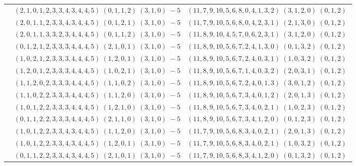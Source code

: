 \documentclass[11pt]{article}
\begin{document}
\begin{longtable}[l]{|c|c|c|}
 \cline{2-3} 
 & $(2 ,1 ,0 ,1 ,2 ,3 ,3 ,4 ,3 ,4 ,4 ,5) \;(0 ,1 ,1 ,2) \;(3 ,1 ,0) \;-5$ & $(11 ,7 ,9 ,10 ,5 ,6 ,8 ,0 ,4 ,1 ,3 ,2) \;(3 ,1 ,2 ,0) \;(0 ,1 ,2) \;$\\ 
 \cline{2-3} 
 & $(2 ,0 ,1 ,1 ,2 ,3 ,3 ,4 ,3 ,4 ,4 ,5) \;(0 ,1 ,2 ,1) \;(3 ,1 ,0) \;-5$ & $(11 ,7 ,9 ,10 ,5 ,6 ,8 ,0 ,4 ,2 ,3 ,1) \;(2 ,1 ,3 ,0) \;(0 ,1 ,2) \;$\\ 
 \cline{2-3} 
 & $(2 ,0 ,1 ,1 ,3 ,3 ,2 ,3 ,4 ,4 ,4 ,5) \;(0 ,1 ,1 ,2) \;(3 ,1 ,0) \;-5$ & $(11 ,8 ,9 ,10 ,4 ,5 ,7 ,0 ,6 ,2 ,3 ,1) \;(3 ,1 ,2 ,0) \;(0 ,1 ,2) \;$\\ 
 \cline{2-3} 
 & $(0 ,1 ,2 ,1 ,2 ,3 ,3 ,3 ,4 ,4 ,4 ,5) \;(2 ,1 ,0 ,1) \;(3 ,1 ,0) \;-5$ & $(11 ,8 ,9 ,10 ,5 ,6 ,7 ,2 ,4 ,1 ,3 ,0) \;(0 ,1 ,3 ,2) \;(0 ,1 ,2) \;$\\ 
 \cline{2-3} 
 & $(1 ,0 ,2 ,1 ,2 ,3 ,3 ,3 ,4 ,4 ,4 ,5) \;(1 ,2 ,0 ,1) \;(3 ,1 ,0) \;-5$ & $(11 ,8 ,9 ,10 ,5 ,6 ,7 ,2 ,4 ,0 ,3 ,1) \;(1 ,0 ,3 ,2) \;(0 ,1 ,2) \;$\\ 
 \cline{2-3} 
 & $(1 ,2 ,0 ,1 ,2 ,3 ,3 ,3 ,4 ,4 ,4 ,5) \;(1 ,0 ,2 ,1) \;(3 ,1 ,0) \;-5$ & $(11 ,8 ,9 ,10 ,5 ,6 ,7 ,1 ,4 ,0 ,3 ,2) \;(2 ,0 ,3 ,1) \;(0 ,1 ,2) \;$\\ 
 \cline{2-3} 
 & $(1 ,1 ,2 ,0 ,2 ,3 ,3 ,3 ,4 ,4 ,4 ,5) \;(1 ,1 ,0 ,2) \;(3 ,1 ,0) \;-5$ & $(11 ,8 ,9 ,10 ,5 ,6 ,7 ,2 ,4 ,0 ,1 ,3) \;(3 ,0 ,1 ,2) \;(0 ,1 ,2) \;$\\ 
 \cline{2-3} 
 & $(1 ,1 ,0 ,2 ,2 ,3 ,3 ,3 ,4 ,4 ,4 ,5) \;(1 ,1 ,2 ,0) \;(3 ,1 ,0) \;-5$ & $(11 ,8 ,9 ,10 ,5 ,6 ,7 ,3 ,4 ,0 ,1 ,2) \;(2 ,0 ,1 ,3) \;(0 ,1 ,2) \;$\\ 
 \cline{2-3} 
 & $(1 ,0 ,1 ,2 ,2 ,3 ,3 ,3 ,4 ,4 ,4 ,5) \;(1 ,2 ,1 ,0) \;(3 ,1 ,0) \;-5$ & $(11 ,8 ,9 ,10 ,5 ,6 ,7 ,3 ,4 ,0 ,2 ,1) \;(1 ,0 ,2 ,3) \;(0 ,1 ,2) \;$\\ 
 \cline{2-3} 
 & $(0 ,1 ,1 ,2 ,2 ,3 ,3 ,3 ,4 ,4 ,4 ,5) \;(2 ,1 ,1 ,0) \;(3 ,1 ,0) \;-5$ & $(11 ,8 ,9 ,10 ,5 ,6 ,7 ,3 ,4 ,1 ,2 ,0) \;(0 ,1 ,2 ,3) \;(0 ,1 ,2) \;$\\ 
 \cline{2-3} 
 & $(1 ,0 ,1 ,2 ,2 ,3 ,3 ,4 ,3 ,4 ,4 ,5) \;(1 ,1 ,2 ,0) \;(3 ,1 ,0) \;-5$ & $(11 ,7 ,9 ,10 ,5 ,6 ,8 ,3 ,4 ,0 ,2 ,1) \;(2 ,0 ,1 ,3) \;(0 ,1 ,2) \;$\\ 
 \cline{2-3} 
 & $(1 ,0 ,1 ,2 ,2 ,3 ,3 ,4 ,3 ,4 ,4 ,5) \;(1 ,2 ,0 ,1) \;(3 ,1 ,0) \;-5$ & $(11 ,7 ,9 ,10 ,5 ,6 ,8 ,3 ,4 ,0 ,2 ,1) \;(1 ,0 ,3 ,2) \;(0 ,1 ,2) \;$\\ 
 \cline{2-3} 
 & $(0 ,1 ,1 ,2 ,2 ,3 ,3 ,4 ,3 ,4 ,4 ,5) \;(2 ,1 ,0 ,1) \;(3 ,1 ,0) \;-5$ & $(11 ,7 ,9 ,10 ,5 ,6 ,8 ,3 ,4 ,1 ,2 ,0) \;(0 ,1 ,3 ,2) \;(0 ,1 ,2) \;$\\ 

\end{longtable}
\end{document}
